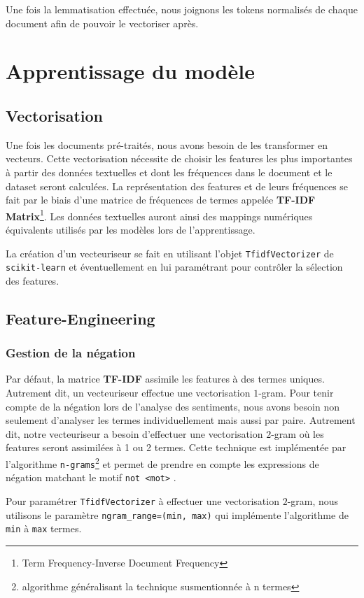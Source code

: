 \documentclass[12pt,a4paper]{report}
\theoremstyle{definition}
\begin{document}
Une fois la lemmatisation effectuée, nous joignons les tokens normalisés de chaque document afin de pouvoir le vectoriser après.

\chapter{Apprentissage du modèle}
\section{Vectorisation}
Une fois les documents pré-traités, nous avons besoin de les transformer en vecteurs. Cette vectorisation nécessite de choisir les features les plus importantes à partir des données textuelles et dont les fréquences dans le document et le dataset seront calculées. La représentation des features et de leurs fréquences se fait par le biais d'une matrice de fréquences de termes appelée \textbf{TF-IDF Matrix}\footnote{Term Frequency-Inverse Document Frequency}. Les données textuelles auront ainsi des mappings numériques équivalents utilisés par les modèles lors de l'apprentissage.

La création d'un vecteuriseur se fait en utilisant l'objet \texttt{TfidfVectorizer} de \texttt{scikit-learn} et éventuellement en lui paramétrant pour contrôler la sélection des features.

\section{Feature-Engineering}
\subsection{Gestion de la négation}
Par défaut, la matrice \textbf{TF-IDF} assimile les features à des termes uniques. Autrement dit, un vecteuriseur effectue une vectorisation $1$-gram.
Pour tenir compte de la négation lors de l'analyse des sentiments, nous avons besoin non seulement d'analyser les termes individuellement mais aussi par paire. Autrement dit, notre vecteuriseur a besoin d'effectuer une vectorisation $2$-gram où les features seront assimilées à 1 ou 2 termes. Cette technique est implémentée par l'algorithme \texttt{n-grams}\footnote{algorithme généralisant la technique susmentionnée à n termes} et permet de prendre en compte les expressions de négation matchant le motif \og \texttt{not <mot>} \fg.

Pour paramétrer \texttt{TfidfVectorizer} à effectuer une vectorisation $2$-gram, nous utilisons le paramètre \texttt{ngram\_range=(min, max)} qui implémente l'algorithme de \texttt{min} à \texttt{max} termes.
\end{document}
